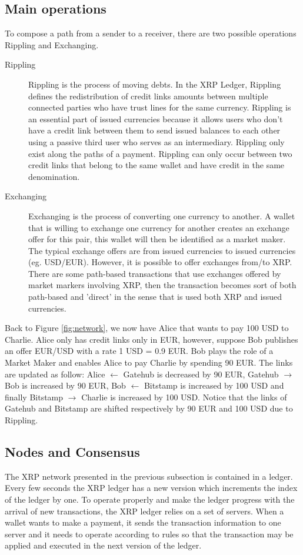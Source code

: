 \subsection{Main operations}
To compose a path from a sender to a receiver, there are two possible operations Rippling and Exchanging.
\begin{description}
\item[Rippling] Rippling is the process of moving debts. In the XRP Ledger, Rippling defines the redistribution of credit links amounts between multiple connected parties who have trust lines for the same currency. Rippling is an essential part of issued currencies because it allows users who don't have a credit link between them to send issued balances to each other using a passive third user who serves as an intermediary. Rippling only exist along the paths of a payment. Rippling can only occur between two credit links that belong to the same wallet and have credit in the same denomination.
\item[Exchanging] Exchanging is the process of converting one currency to another. A wallet that is willing to exchange one currency for another creates an exchange offer for this pair, this wallet will then be identified as a market maker. The typical exchange offers are from issued currencies to issued currencies (eg. USD/EUR). However, it is possible to offer exchanges from/to XRP. There are some path-based transactions that use exchanges offered by market markers involving XRP, then the transaction becomes sort of both path-based and 'direct' in the sense that is used both XRP and issued currencies.
\end{description}
Back to Figure \ref{fig:network}, we now have Alice that wants to pay 100 USD to Charlie. Alice only has credit links only in EUR, however, suppose Bob publishes an offer EUR/USD with a rate 1 USD = 0.9 EUR. Bob plays the role of a Market Maker and enables Alice to pay Charlie by spending 90 EUR. The links are updated as follow: Alice $\leftarrow$ Gatehub is decreased by 90 EUR, Gatehub $\rightarrow$ Bob is increased by 90 EUR, Bob $\leftarrow$ Bitstamp is increased by 100 USD and finally Bitstamp $\rightarrow$ Charlie is increased by 100 USD.
Notice that the links of Gatehub and Bitstamp are shifted respectively by 90 EUR and 100 USD due to Rippling.

\subsection{Nodes and Consensus}
The XRP network presented in the previous subsection is contained in a ledger. Every few seconds the XRP ledger has a new version which increments the index of the ledger by one. To operate properly and make the ledger progress with the arrival of new transactions, the XRP ledger relies on a set of servers. When a wallet wants to make a payment, it sends the transaction information to one server and it needs to operate according to rules so that the transaction may be applied and executed in the next version of the ledger.

